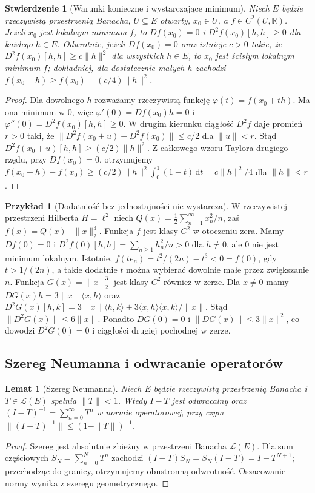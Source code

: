 \documentclass[11pt,a4paper]{article}
\numberwithin{equation}{section}
\theoremstyle{plain}
\newtheorem{stwierdzenie}[twierdzenie]{Stwierdzenie}
\newtheorem{lemat}[twierdzenie]{Lemat}
\theoremstyle{definition}
\newtheorem{przyklad}[twierdzenie]{Przykład}
\theoremstyle{remark}
\newcommand{\R}{\mathbb R}
\begin{document}
\begin{stwierdzenie}[Warunki konieczne i wystarczające minimum]
\label{prop:extremum15}
Niech $E$ będzie rzeczywistą przestrzenią Banacha, $U\subseteq E$ otwarty, $x_0\in U$, a $f\in C^2(U,\R)$. Jeżeli $x_0$ jest lokalnym minimum $f$, to $Df(x_0)=0$ i $D^2f(x_0)[h,h]\ge0$ dla każdego $h\in E$. Odwrotnie, jeżeli $Df(x_0)=0$ oraz istnieje $c>0$ takie, że $D^2f(x_0)[h,h]\ge c\|h\|^2$ dla wszystkich $h\in E$, to $x_0$ jest ścisłym lokalnym minimum $f$; dokładniej, dla dostatecznie małych $h$ zachodzi $f(x_0+h)\ge f(x_0)+(c/4)\|h\|^2$.
\end{stwierdzenie}
\begin{proof}
Dla dowolnego $h$ rozważamy rzeczywistą funkcję $\varphi(t)=f(x_0+th)$. Ma ona minimum w $0$, więc $\varphi'(0)=Df(x_0)h=0$ i $\varphi''(0)=D^2f(x_0)[h,h]\ge0$. W drugim kierunku ciągłość $D^2f$ daje promień $r>0$ taki, że $\|D^2f(x_0+u)-D^2f(x_0)\|\le c/2$ dla $\|u\|<r$. Stąd $D^2f(x_0+u)[h,h]\ge(c/2)\|h\|^2$. Z całkowego wzoru Taylora drugiego rzędu, przy $Df(x_0)=0$, otrzymujemy $f(x_0+h)-f(x_0)\ge(c/2)\|h\|^2\int_0^1(1-t)\,\mathrm dt=c\|h\|^2/4$ dla $\|h\|<r$.
\end{proof}

\begin{przyklad}[Dodatniość bez jednostajności nie wystarcza]
\label{ex:positive-hessian15}
W rzeczywistej przestrzeni Hilberta $H=\ell^2$ niech
$Q(x)=\frac12\sum_{n=1}^\infty x_n^2/n$, zaś $f(x)=Q(x)-\|x\|_2^3$. Funkcja $f$ jest klasy $C^2$ w otoczeniu zera. Mamy $Df(0)=0$ i $D^2f(0)[h,h]=\sum_{n\ge1}h_n^2/n>0$ dla $h\ne0$, ale $0$ nie jest minimum lokalnym. Istotnie, $f(te_n)=t^2/(2n)-t^3<0=f(0)$, gdy $t>1/(2n)$, a takie dodatnie $t$ można wybierać dowolnie małe przez zwiększanie $n$. Funkcja $G(x)=\|x\|_2^3$ jest klasy $C^2$ również w zerze. Dla $x\ne0$ mamy
$DG(x)h=3\|x\|\langle x,h\rangle$ oraz
$D^2G(x)[h,k]=3\|x\|\langle h,k\rangle+3\langle x,h\rangle\langle x,k\rangle/\|x\|$.
Stąd $\|D^2G(x)\|\le6\|x\|$. Ponadto $DG(0)=0$ i $\|DG(x)\|\le3\|x\|^2$, co dowodzi $D^2G(0)=0$ i ciągłości drugiej pochodnej w zerze.
\end{przyklad}

\subsection{Szereg Neumanna i odwracanie operatorów}

\begin{lemat}[Szereg Neumanna]
\label{lem:neumann15}
Niech $E$ będzie rzeczywistą przestrzenią Banacha i $T\in\mathcal L(E)$ spełnia $\|T\|<1$. Wtedy $I-T$ jest odwracalny oraz
$(I-T)^{-1}=\sum_{n=0}^\infty T^n$ w normie operatorowej, przy czym $\|(I-T)^{-1}\|\le(1-\|T\|)^{-1}$.
\end{lemat}
\begin{proof}
Szereg jest absolutnie zbieżny w przestrzeni Banacha $\mathcal L(E)$. Dla sum częściowych $S_N=\sum_{n=0}^N T^n$ zachodzi $(I-T)S_N=S_N(I-T)=I-T^{N+1}$; przechodząc do granicy, otrzymujemy obustronną odwrotność. Oszacowanie normy wynika z szeregu geometrycznego.
\end{proof}
\end{document}
